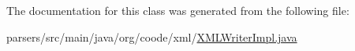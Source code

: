 The documentation for this class was generated from the following file\-:\begin{DoxyCompactItemize}
\item 
parsers/src/main/java/org/coode/xml/\hyperlink{_x_m_l_writer_impl_8java}{X\-M\-L\-Writer\-Impl.\-java}\end{DoxyCompactItemize}
